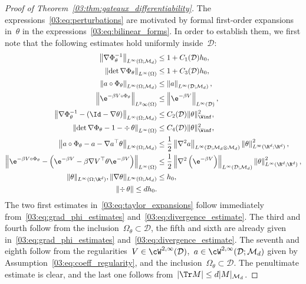 \begin{proof}[Proof of Theorem~\ref{03:thm:gateaux_differentiability}]
    The expressions~\eqref{03:eq:perturbations} are motivated by formal first-order expansions in~$\theta$ in the expressions~\eqref{03:eq:bilinear_forms}.
    In order to establish them, we first note that the following estimates hold uniformly inside~$\mathcal D$:
    \begin{equation}
        \label{03:eq:taylor_expansions}
        \begin{aligned}
            \left\|\nabla \Phi_\theta^{-1}\right\|_{L^\infty(\Omega;\mathcal M_d)} &\leq 1+C_1(\mathcal D)h_0,\\
            \left\|\det \nabla \Phi_\theta\right\|_{L^\infty(\Omega)} &\leq 1+C_3(\mathcal D)h_0,\\
            \left\|a\circ\Phi_\theta\right\|_{L^\infty(\Omega;\mathcal M_d)}&\leq \left\|a\right\|_{L^\infty(\mathcal D;\mathcal M_d)},\\
            \left\|\e^{-\beta V\circ\Phi_\theta}\right\|_{L^2\infty(\Omega)}&\leq \left\|\e^{-\beta V}\right\|_{L^\infty(\mathcal D)},\\
            \left\|\nabla\Phi_\theta^{-1} - (\Id - \nabla\theta)\right\|_{L^\infty(\Omega;\mathcal M_d)}&\leq C_2(\mathcal D)\|\theta\|^2_{\Winf},\\
            \left\|\det\nabla\Phi_\theta - 1 - \div\,\theta\right\|_{L^\infty(\Omega)}&\leq C_4(\mathcal D)\|\theta\|^2_{\Winf},\\
            \left\|a\circ\Phi_\theta - a- \nabla a^\top\theta\right\|_{L^\infty(\Omega;\mathcal M_d)} & \leq \frac12\left\|\nabla^2 a\right\|_{L^\infty(\mathcal D;\mathcal M_d\otimes \mathcal M_d)}\left\|\theta\right\|^2_{L^\infty(\R^d;\R^d)},\\
            \left\|\e^{-\beta V\circ\Phi_\theta}-\left(\e^{-\beta V}- \beta\nabla V^\top \theta \e^{-\beta V}\right) \right\|_{L^\infty(\Omega)} &\leq \frac12\left\|\nabla^2 \left(\e^{-\beta V}\right)\right\|_{L^\infty(\mathcal D;\mathcal M_d)}\left\|\theta\right\|^2_{L^\infty(\R^d;\R^d)},\\
            \|\theta\|_{L^\infty(\Omega;\R^d)},\|\nabla\theta\|_{L^\infty(\Omega;\mathcal M_d)}&\leq h_0,\\
            \left\|\div\,\theta\right\|\leq d h_0 .
        \end{aligned}
    \end{equation}
    The two first estimates in~\eqref{03:eq:taylor_expansions} follow immediately from~\eqref{03:eq:grad_phi_estimates} and~\eqref{03:eq:divergence_estimate}. The third and fourth follow from the inclusion~$\Omega_\theta\subset \mathcal D$, the fifth and sixth are already given in~\eqref{03:eq:grad_phi_estimates} and~\eqref{03:eq:divergence_estimate}. The seventh and eighth follow from the regularities~$V\in \cW^{2,\infty}(\mathcal D)$,~$a\in \cW^{2,\infty}(\mathcal D;\mathcal M_d)$ given by Assumption~\eqref{03:eq:coeff_regularity}, and the inclusion~$\Omega_\theta\subset\mathcal D$.
    The penultimate estimate is clear, and the last one follows from~$|\Tr M|\leq d|M|_{\mathcal M_d}$.


\end{proof}
